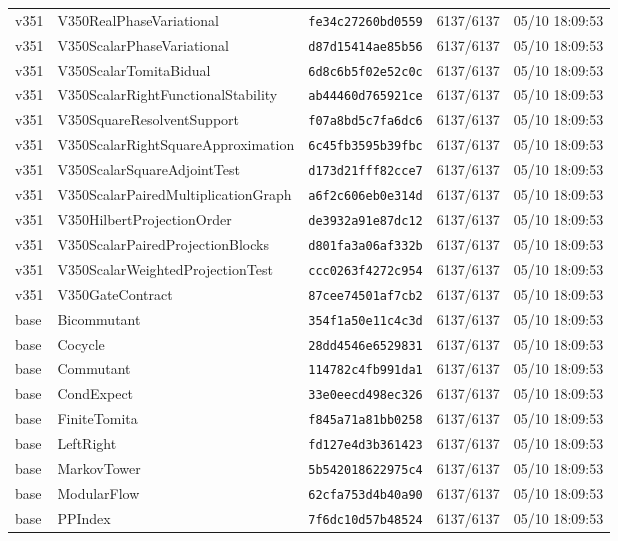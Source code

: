 \documentclass[11pt]{article}
\theoremstyle{definition}\newtheorem{deriv}{Derivation}
\begin{document}
{\begin{longtable}{@{}lllll@{}}
v351 & V350RealPhaseVariational & \texttt{fe34c27260bd0559} & 6137/6137 & 05/10 18:09:53 \\
v351 & V350ScalarPhaseVariational & \texttt{d87d15414ae85b56} & 6137/6137 & 05/10 18:09:53 \\
v351 & V350ScalarTomitaBidual & \texttt{6d8c6b5f02e52c0c} & 6137/6137 & 05/10 18:09:53 \\
v351 & V350ScalarRightFunctionalStability & \texttt{ab44460d765921ce} & 6137/6137 & 05/10 18:09:53 \\
v351 & V350SquareResolventSupport & \texttt{f07a8bd5c7fa6dc6} & 6137/6137 & 05/10 18:09:53 \\
v351 & V350ScalarRightSquareApproximation & \texttt{6c45fb3595b39fbc} & 6137/6137 & 05/10 18:09:53 \\
v351 & V350ScalarSquareAdjointTest & \texttt{d173d21fff82cce7} & 6137/6137 & 05/10 18:09:53 \\
v351 & V350ScalarPairedMultiplicationGraph & \texttt{a6f2c606eb0e314d} & 6137/6137 & 05/10 18:09:53 \\
v351 & V350HilbertProjectionOrder & \texttt{de3932a91e87dc12} & 6137/6137 & 05/10 18:09:53 \\
v351 & V350ScalarPairedProjectionBlocks & \texttt{d801fa3a06af332b} & 6137/6137 & 05/10 18:09:53 \\
v351 & V350ScalarWeightedProjectionTest & \texttt{ccc0263f4272c954} & 6137/6137 & 05/10 18:09:53 \\
v351 & V350GateContract & \texttt{87cee74501af7cb2} & 6137/6137 & 05/10 18:09:53 \\
base & Bicommutant & \texttt{354f1a50e11c4c3d} & 6137/6137 & 05/10 18:09:53 \\
base & Cocycle & \texttt{28dd4546e6529831} & 6137/6137 & 05/10 18:09:53 \\
base & Commutant & \texttt{114782c4fb991da1} & 6137/6137 & 05/10 18:09:53 \\
base & CondExpect & \texttt{33e0eecd498ec326} & 6137/6137 & 05/10 18:09:53 \\
base & FiniteTomita & \texttt{f845a71a81bb0258} & 6137/6137 & 05/10 18:09:53 \\
base & LeftRight & \texttt{fd127e4d3b361423} & 6137/6137 & 05/10 18:09:53 \\
base & MarkovTower & \texttt{5b542018622975c4} & 6137/6137 & 05/10 18:09:53 \\
base & ModularFlow & \texttt{62cfa753d4b40a90} & 6137/6137 & 05/10 18:09:53 \\
base & PPIndex & \texttt{7f6dc10d57b48524} & 6137/6137 & 05/10 18:09:53 \\

\end{longtable}}
\end{document}
